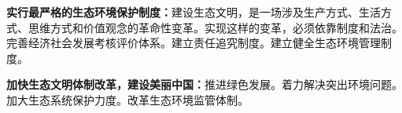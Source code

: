 {\textbf{实行最严格的生态环境保护制度：}}建设生态文明，是一场涉及生产方式、生活方式、思维方式和价值观念的革命性变革。实现这样的变革，必须依靠制度和法治。完善经济社会发展考核评价体系。建立责任追究制度。建立健全生态环境管理制度。~

{\textbf{加快生态文明体制改革，建设美丽中国：}}推进绿色发展。着力解决突出环境问题。加大生态系统保护力度。改革生态环境监管体制。
